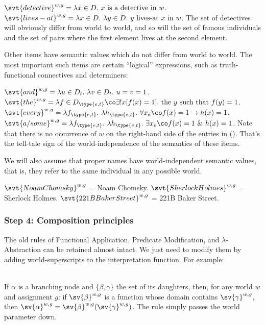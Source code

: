 \pex \a
$\svt{detective}^{w,g} = \lambda x \in D.\ x \mbox{ is a detective in } w$. \a
$\svt{lives-at}^{w,g} = \lambda x \in D.\ \lambda y \in D.\ y \mbox{ lives-at }
x \mbox{ in } w $. \xe
%
The set of detectives will obviously differ from world to world, and so will the
set of famous individuals and the set of pairs where the first element lives at
the second element.

\clearpage
Other items have semantic values which do not differ from world to world. The
most important such items are certain ``logical'' expressions, such as
truth-functional connectives and determiners:

\pex
\a $\svt{and}^{w,g} = \lambda u \in D_t.\ \lambda v \in D_t.\ u=v=1
$.
\a $\svt{the}^{w,g} = \lambda f \in D_{\type{e,t}}\co \exists !
x[f(x) = 1]. \mbox{ the } y \mbox{ such that } f(y) = 1$.
\a $\svt{every}^{w,g} = \lambda f_{\type{e,t}}.\ \lambda
h_{\type{e,t}}.\ \forall x_e\co f(x) = 1 \rightarrow h(x) = 1 $.
\a $\svt{a/some}^{w,g} = \lambda f_{\type{e,t}}.\ \lambda
h_{\type{e,t}}.\ \exists x_e\co f(x) = 1\ \&\ h(x) = 1 $.
\xe
%
Note that there is no occurrence of $w$ on the right-hand side of the entries in
(\lastx). That's the tell-tale sign of the world-independence of the semantics of
these items.

We will also assume that proper names have world-independent semantic values,
that is, they refer to the same individual in any possible world.

\pex
\a $\svt{Noam Chomsky}^{w,g}$ = Noam Chomsky. 
\a $\svt{Sherlock Holmes}^{w,g}$ = Sherlock Holmes. 
\a $\svt{221B Baker Street}^{w,g}$ = 221B Baker Street.
\xe

\subsubsection{Step 4: Composition principles} \label{sec:comp-princ}

The old rules of Functional Application, Predicate Modification, and
$\lambda$-Abstraction can be retained almost intact. We just need to modify them
by adding world-superscripts to the interpretation function. For example:

\ex {}\\
If $\alpha$ is a branching node and $\{\beta, \gamma\}$ the set of its
daughters, then, for any world $w$ and assignment $g$: if
$\sv{\beta}^{w,g}$ is a function whose domain contains
$\sv{\gamma}^{w,g}$, then
$\sv{\alpha}^{w,g} = \sv{\beta}^{w,g} (\sv{\gamma}^{w,g})$.
\xe
%
The rule simply passes the world parameter down.

